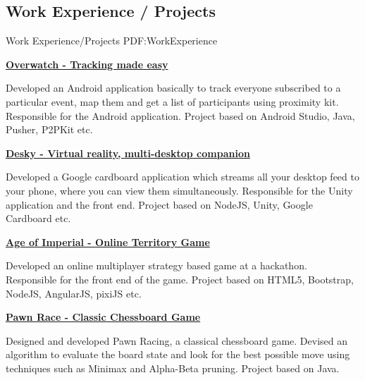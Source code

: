 \documentclass[letterpaper,10pt,oneside]{article}
\begin{document}
\begin{body}

\section
{Work Experience / Projects}
{Work Experience/Projects}
{PDF:WorkExperience}

\BulletItem
\href{https://github.com/SomeRandomTeam/}{\textbf{Overwatch - Tracking made easy}}
\hfill
{}
\begin{detail}
\GapNoBreak
\SubBulletItem
Developed an Android application basically to track everyone subscribed to a particular event, map them and get a list of participants using proximity kit.
\SubBulletItem
Responsible for the Android application.
\SubBulletItem
Project based on Android Studio, Java, Pusher, P2PKit etc.
\end{detail}

\GapNoBreak

\BulletItem
\href{https://github.com/SomeRandomTeam/}{\textbf{Desky - Virtual reality, multi-desktop companion}}
\hfill
{}
\begin{detail}
\GapNoBreak
\SubBulletItem
Developed a Google cardboard application which streams all your desktop feed to your phone, where you can view them simultaneously.
\SubBulletItem
Responsible for the Unity application and the front end.
\SubBulletItem
Project based on NodeJS, Unity, Google Cardboard etc.
\end{detail}

\GapNoBreak

\BulletItem
\href{https://github.com/SomeRandomTeam/hackatbrookes2016}{\textbf{Age of Imperial - Online Territory Game}}
\hfill
{}
\begin{detail}
\GapNoBreak
\SubBulletItem
Developed an online multiplayer strategy based game at a hackathon.
\SubBulletItem
Responsible for the front end of the game.
\SubBulletItem
Project based on HTML5, Bootstrap, NodeJS, AngularJS, pixiJS etc.
\end{detail}

\GapNoBreak

\BulletItem
\href{https://github.com/mishrabhinav/javachess-pawnrace}{\textbf{Pawn Race - Classic Chessboard Game}}
\hfill
{}
\begin{detail}
\GapNoBreak
\SubBulletItem
Designed and developed Pawn Racing, a classical chessboard game.
\SubBulletItem
Devised an algorithm to evaluate the board state and look for the best possible move using techniques such as Minimax and Alpha-Beta pruning.
\SubBulletItem
Project based on Java.
\end{detail}


\end{body}
\end{document}

